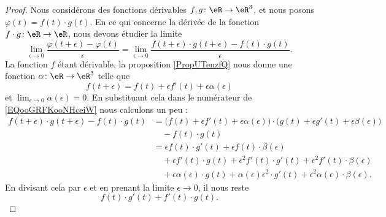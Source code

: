 \begin{proof}
	Nous considérons des fonctions dérivables \( f,g\colon \eR\to \eR^3\), et nous posons \( \varphi(t)=f(t)\cdot g(t)\). En ce qui concerne la dérivée de la fonction \( f\cdot g\colon \eR\to \eR\), nous devons étudier la limite
	\begin{equation}        \label{EQooGRFKooNHceiW}
		\lim_{\epsilon\to 0}\frac{ \varphi(t+\epsilon)-\varphi(t) }{ \epsilon }=\lim_{\epsilon\to 0}\frac{ f(t+\epsilon)\cdot g(t+\epsilon)-f(t)\cdot g(t) }{ \epsilon }.
	\end{equation}
	La fonction \( f\) étant dérivable, la proposition \ref{PropUTenzfQ} nous donne une fonction \( \alpha\colon \eR\to \eR^3\) telle que
	\begin{equation}
		f(t+\epsilon)=f(t)+\epsilon f'(t)+\epsilon\alpha(\epsilon)
	\end{equation}
	et \( \lim_{\epsilon\to 0}\alpha(\epsilon)=0\). En substituant cela dans le numérateur de \eqref{EQooGRFKooNHceiW} nous calculons un peu :
    \begin{subequations}        \label{SUBEQSooMNAZooQjGGpg}
		\begin{align}
			f(t+\epsilon)\cdot g(t+\epsilon)-f(t)\cdot g(t) & =\big( f(t)+\epsilon f'(t)+\epsilon \alpha(\epsilon) \big)\cdot\big( g(t)+\epsilon g'(t)+\epsilon\beta(\epsilon) \big)          \\
			                                                & \quad - f(t)\cdot g(t)                                                                                                          \\
                                                            & =\epsilon f(t)\cdot g'(t)+\epsilon f(t)\cdot \beta(\epsilon)\\
                                                            &\quad +\epsilon f'(t)\cdot g(t) + \epsilon^2 f'(t)\cdot g'(t)+\epsilon^2 f'(t)\cdot \beta(\epsilon)\\
& \quad+\epsilon\alpha(\epsilon)\cdot g(t)+\alpha(\epsilon)\epsilon^2\cdot g'(t)+\epsilon^2\alpha(\epsilon)\cdot \beta(\epsilon).
		\end{align}
	\end{subequations}
	En divisant cela par \( \epsilon\) et en prenant la limite \( \epsilon\to 0\), il nous reste
	\begin{equation}
		f(t)\cdot g'(t)+f'(t)\cdot g(t).
	\end{equation}
\end{proof}

